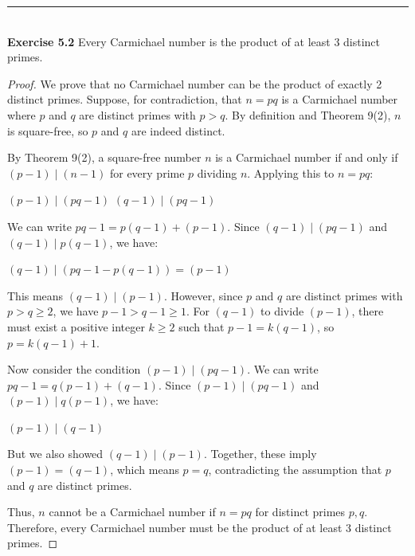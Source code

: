 \documentclass[a4paper]{article}
\begin{document}
\noindent\rule{12cm}{0.4pt}\\
\noindent \textbf{Exercise 5.2} Every Carmichael number is the product of at least 3 distinct primes.
\begin{proof}
We prove that no Carmichael number can be the product of exactly 2 distinct primes. Suppose, for contradiction, that $n = pq$ is a Carmichael number where $p$ and $q$ are distinct primes with $p > q$. By definition and Theorem 9(2), $n$ is square-free, so $p$ and $q$ are indeed distinct.

By Theorem 9(2), a square-free number $n$ is a Carmichael number if and only if $(p - 1) \mid (n - 1)$ for every prime $p$ dividing $n$. Applying this to $n = pq$:
\begin{center}
$(p - 1) \mid (pq - 1)$ \quad {} \quad $(q - 1) \mid (pq - 1)$
\end{center}

We can write $pq - 1 = p(q - 1) + (p - 1)$. Since $(q - 1) \mid (pq - 1)$ and $(q - 1) \mid p(q - 1)$, we have:
\begin{center}
$(q - 1) \mid (pq - 1 - p(q - 1)) = (p - 1)$
\end{center}

This means $(q - 1) \mid (p - 1)$. However, since $p$ and $q$ are distinct primes with $p > q \geq 2$, we have $p - 1 > q - 1 \geq 1$. For $(q - 1)$ to divide $(p - 1)$, there must exist a positive integer $k \geq 2$ such that $p - 1 = k(q - 1)$, so $p = k(q - 1) + 1$.

Now consider the condition $(p - 1) \mid (pq - 1)$. We can write $pq - 1 = q(p - 1) + (q - 1)$. Since $(p - 1) \mid (pq - 1)$ and $(p - 1) \mid q(p - 1)$, we have:
\begin{center}
$(p - 1) \mid (q - 1)$
\end{center}

But we also showed $(q - 1) \mid (p - 1)$. Together, these imply $(p - 1) = (q - 1)$, which means $p = q$, contradicting the assumption that $p$ and $q$ are distinct primes.

Thus, $n$ cannot be a Carmichael number if $n = pq$ for distinct primes $p, q$. Therefore, every Carmichael number must be the product of at least 3 distinct primes.
\end{proof}
\end{document}
